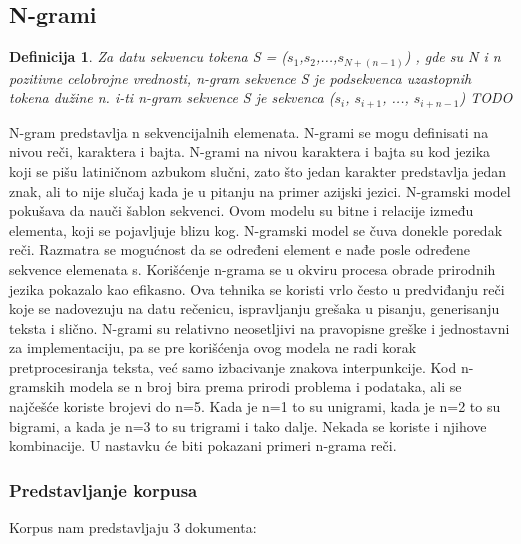 \documentclass[12pt,oneside]{memoir}
\begin{document}
\subsection{N-grami}

\newtheorem{mydef}{Definicija}
\begin{mydef}
Za datu sekvencu tokena S = \normalfont($s_1$,$s_2$,...,$s_{N+(n-1)}$\normalfont) , gde su N i n pozitivne celobrojne vrednosti,  n-gram sekvence S je podsekvenca uzastopnih tokena dužine n.  i-ti n-gram sekvence S je sekvenca ($s_i$, $s_{i+1}$, ..., $s_{i+n-1}$) TODO
\end{mydef}

N-gram predstavlja n sekvencijalnih elemenata.  N-grami se mogu definisati na nivou reči, karaktera i bajta.  N-grami na nivou karaktera i bajta su kod jezika koji se pišu latiničnom azbukom slučni,  zato što jedan karakter predstavlja jedan znak, ali to nije slučaj kada je u pitanju na primer azijski jezici.  N-gramski model pokušava da nauči šablon sekvenci.  Ovom modelu su bitne i relacije između elementa, koji se pojavljuje blizu kog.  N-gramski model se čuva donekle poredak reči.  Razmatra se mogućnost da se određeni element e nađe posle određene sekvence elemenata s. 
Korišćenje n-grama se u okviru procesa obrade prirodnih jezika pokazalo kao efikasno.  Ova tehnika se koristi vrlo često u predviđanju reči koje se nadovezuju na datu rečenicu, ispravljanju grešaka u pisanju, generisanju teksta i slično.  
N-grami su relativno neosetljivi na pravopisne greške i jednostavni za implementaciju, pa se pre korišćenja ovog modela ne radi korak pretprocesiranja teksta, već samo izbacivanje znakova interpunkcije.  
Kod n-gramskih modela se n broj bira prema prirodi problema i podataka,  ali se najčešće koriste brojevi do n=5.  Kada je n=1 to su unigrami, kada je n=2 to su bigrami,  a kada je n=3 to su trigrami i tako dalje.  Nekada se koriste i njihove kombinacije. 
U nastavku će biti pokazani primeri n-grama reči.

\subsubsection{Predstavljanje korpusa}
Korpus nam predstavljaju 3 dokumenta:
\newline
\newline
\noindent{}
\newline
\newline
\end{document}

